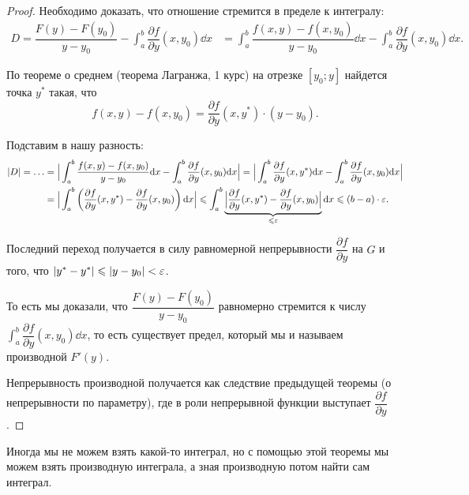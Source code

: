 \begin{proof}
    Необходимо доказать, что отношение стремится в пределе к интегралу:
    \begin{align*}
        D = \dfrac{F(y) - F(y_0)}{y - y_0} - \int_a^b \dfrac{\partial f}{\partial y} (x, y_0) \dd x
        &= \int_a^b \dfrac{f(x, y) - f(x, y_0)}{y - y_0} \dd x - \int_a^b \dfrac{\partial f}{\partial y} (x, y_0) \dd x.
    \end{align*}

    По теореме о среднем (теорема Лагранжа, 1 курс) на отрезке $[y_0; y]$ найдется точка $y^*$ такая, что
    \begin{equation*}
        f(x, y) - f(x, y_0) = \dfrac{\partial f}{\partial y} (x, y^*) \cdot (y - y_0).
    \end{equation*}

    Подставим в нашу разность:
    \begin{align*}
        |D| = \dots
        &= \Big|\int_a^b \dfrac{f(x, y) - f(x, y_0)}{y - y_0} \dd x - \int_a^b \dfrac{\partial f}{\partial y} (x, y_0) \dd x \Big| 
        = \Big|\int_a^b \dfrac{\partial f}{\partial y}(x, y^*) \dd x - \int_a^b \dfrac{\partial f}{\partial y} (x, y_0) \dd x \Big|\\
        &= \Big|\int_a^b \left(\dfrac{\partial f}{\partial y}(x, y^*) - \dfrac{\partial f}{\partial y} (x, y_0) \right) \dd x \Big|
        \leqslant \int_a^b \underbrace{\Big|\dfrac{\partial f}{\partial y}(x, y^*) - \dfrac{\partial f}{\partial y} (x, y_0) \Big|}_{\leqslant \varepsilon} \dd x
        \leqslant (b - a) \cdot \varepsilon.
    \end{align*}

    Последний переход получается в силу равномерной непрерывности $\dfrac{\partial f}{\partial y}$ на $G$ и того, что $|y^* - y^*| \leqslant |y - y_0| < \varepsilon$.

    То есть мы доказали, что $\dfrac{F(y) - F(y_0)}{y - y_0}$ равномерно стремится к числу $\int_a^b \dfrac{\partial f}{\partial y} (x, y_0) \dd x$, то есть существует предел, который мы и называем производной $F'(y)$.

    Непрерывность производной получается как следствие предыдущей теоремы (о непрерывности по параметру), где в роли непрерывной функции выступает $\dfrac{\partial f}{\partial y}$.
\end{proof}

Иногда мы не можем взять какой-то интеграл, но с помощью этой теоремы мы можем взять производную интеграла, а зная производную потом найти сам интеграл.

